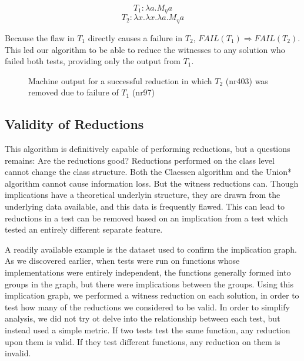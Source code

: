 \documentclass[11pt,twoside]{article}
\begin{document}
$$T_1 : \lambda a.M_\eta a$$
$$T_2 : \lambda x.\lambda x.\lambda a.M_\eta a$$

Because the flaw in $T_1$ directly causes a failure in $T_2$, $FAIL(T_1) \Rightarrow FAIL(T_2)$. This led our algorithm to be able to reduce the witnesses to any solution who failed both tests, providing only the output from $T_1$.

\begin{figure}

\caption{Machine output for a successful reduction in which $T_2$ (nr403) was removed due to failure of $T_1$ (nr97)}
\end{figure}

\subsection{Validity of Reductions}

This algorithm is definitively  capable of performing reductions, but a questions remains: Are the reductions good? Reductions performed on the class level cannot change the class structure. Both the Claessen algorithm and the Union* algorithm cannot cause information loss. But the witness reductions can. Though implications have a theoretical underlyin structure, they are drawn from the underlying data available, and this data is frequently flawed. This can lead to reductions in a test can be removed based on an implication from a test which tested an entirely different separate feature.

A readily available example is the dataset used to confirm the implication graph. As we discovered earlier, when tests were run on functions whose implementations were entirely independent, the functions generally formed into groups in the  graph, but there were implications between the groups. Using this implication graph, we performed a witness reduction on each solution, in order to test how many of the reductions we considered to be valid. In order to simplify analysis, we did not try ot delve into the relationship between each test, but instead used a simple metric. If two tests test the same function, any reduction upon them is valid. If they test different  functions, any reduction on them is invalid.

\end{document}
